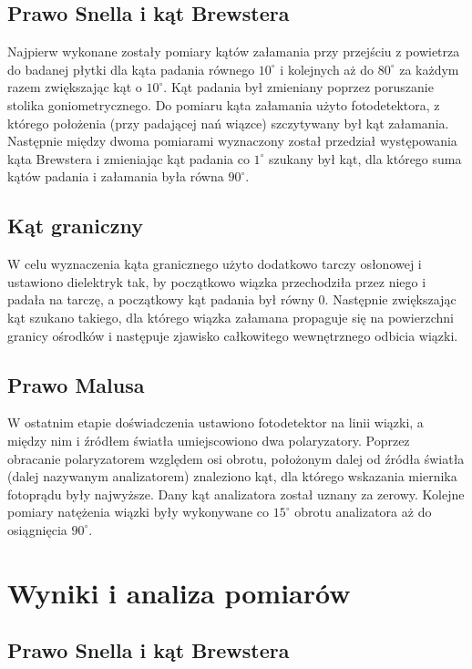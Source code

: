 \documentclass[a4paper,10pt]{article}
\begin{document}
\subsection{Prawo Snella i kąt Brewstera}
Najpierw wykonane zostały pomiary kątów załamania przy przejściu z powietrza do badanej płytki dla kąta padania równego $10^\circ$ i kolejnych
aż do $80^\circ$ za każdym razem zwiększając kąt o $10^\circ$. Kąt padania był zmieniany poprzez poruszanie stolika goniometrycznego. Do
pomiaru kąta załamania użyto fotodetektora, z którego położenia (przy padającej nań wiązce) szczytywany był kąt załamania. Następnie między
dwoma pomiarami wyznaczony został przedział występowania kąta Brewstera i zmieniając kąt padania co $1^\circ$ szukany był kąt, dla którego
suma kątów padania i załamania była równa $90^\circ$.

\subsection{Kąt graniczny}
W celu wyznaczenia kąta granicznego użyto dodatkowo tarczy osłonowej i ustawiono dielektryk tak, by początkowo wiązka przechodziła przez
niego i  padała na tarczę, a początkowy kąt padania był równy 0.
Następnie zwiększając kąt szukano takiego, dla którego wiązka załamana propaguje się na powierzchni granicy ośrodków i
następuje zjawisko całkowitego wewnętrznego odbicia wiązki.

\subsection{Prawo Malusa}
W ostatnim etapie doświadczenia ustawiono fotodetektor na linii wiązki, a między nim i źródłem światła umiejscowiono dwa polaryzatory.
Poprzez obracanie polaryzatorem względem osi obrotu, położonym dalej od źródła światła  (dalej nazywanym analizatorem) znaleziono kąt,
dla którego wskazania miernika fotoprądu były najwyższe. Dany kąt analizatora został uznany za zerowy. Kolejne pomiary natężenia wiązki
były wykonywane co $15^\circ$ obrotu analizatora aż do osiągnięcia $90^\circ$.

\section{Wyniki i analiza pomiarów}
\subsection{Prawo Snella i kąt Brewstera}
\end{document}
